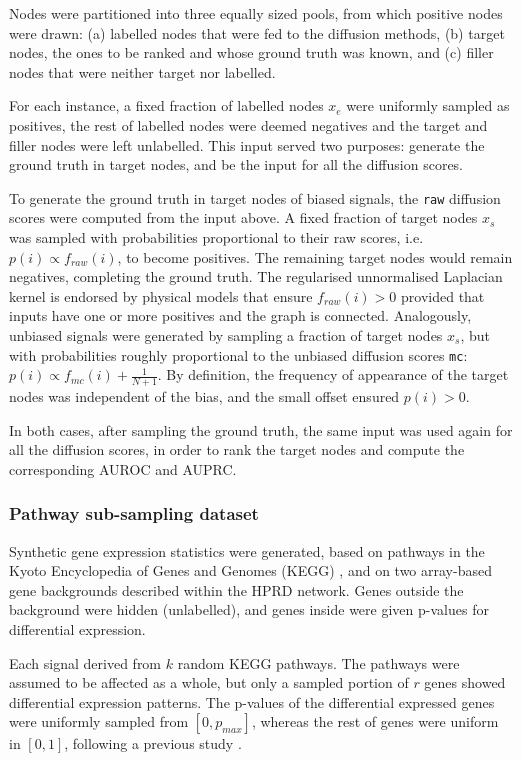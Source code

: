 \documentclass[final]{bioinfo}
\newcommand{\method}{\texttt}
\begin{document}
\begin{methods}
Nodes were partitioned into three equally sized pools, from which positive nodes were drawn: (a) labelled nodes that were fed to the diffusion methods, (b) target nodes, the ones to be ranked and whose ground truth was known, and (c) filler nodes that were neither target nor labelled. 

For each instance, a fixed fraction of labelled nodes $x_e$ were uniformly sampled as positives, the rest of labelled nodes were deemed negatives and the target and filler nodes were left unlabelled.
This input served two purposes: generate the ground truth in target nodes, and be the input for all the diffusion scores.

To generate the ground truth in target nodes of biased signals, the \method{raw} diffusion scores were computed from the input above. 
A fixed fraction of target nodes $x_s$ was sampled with probabilities proportional to their raw scores, i.e. $p(i) \propto f_{raw}(i)$, to become positives. 
The remaining target nodes would remain negatives, completing the ground truth. 
The regularised unnormalised Laplacian kernel is endorsed by physical models that ensure $f_{raw}(i) > 0$ provided that inputs have one or more positives and the graph is connected.
Analogously, unbiased signals were generated by sampling a fraction of target nodes $x_s$, but with probabilities roughly proportional to the unbiased diffusion scores \method{mc}: $ p(i) \propto f_{mc}(i) + \frac{1}{N + 1}$. 
By definition, the frequency of appearance of the target nodes was independent of the bias, and the small offset ensured $ p(i) > 0 $.

In both cases, after sampling the ground truth, the same input was used again for all the diffusion scores, in order to rank the target nodes and compute the corresponding AUROC and AUPRC.

\subsubsection*{Pathway sub-sampling dataset}

Synthetic gene expression statistics were generated, based on pathways in the Kyoto Encyclopedia of Genes and Genomes (KEGG) \citep{kegg2017}, and on two array-based gene backgrounds described within the HPRD network. 
Genes outside the background were hidden (unlabelled), and genes inside were given p-values for differential expression.  

Each signal derived from $k$ random KEGG pathways. 
The pathways were assumed to be affected as a whole, but only a sampled portion of $r$ genes showed differential expression patterns. 
The p-values of the differential expressed genes were uniformly sampled from $[0, p_{max}]$, whereas the rest of genes were uniform in $[0,1]$, following a previous study \citep{pathway_simulation_pvals}.


\end{methods}
\end{document}
